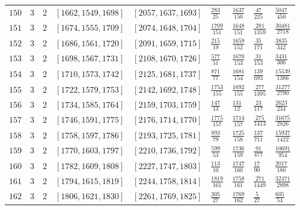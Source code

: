\documentclass[12pt]{extarticle}
\begin{document}
\begin{longtable}{lllllllll}
$150$ & $3$ & $2$ & $\left[1662, 1549, 1698\right]$ & $\left[2057, 1637, 1693\right]$ & $\frac{283}{25}$ & $\frac{1637}{150}$ & $\frac{47}{225}$ & $\frac{5047}{450}$ \\
$151$ & $3$ & $2$ & $\left[1674, 1555, 1709\right]$ & $\left[2074, 1648, 1704\right]$ & $\frac{1709}{151}$ & $\frac{1648}{151}$ & $\frac{281}{1359}$ & $\frac{30481}{2718}$ \\
$152$ & $3$ & $2$ & $\left[1686, 1561, 1720\right]$ & $\left[2091, 1659, 1715\right]$ & $\frac{215}{19}$ & $\frac{1659}{152}$ & $\frac{35}{171}$ & $\frac{3835}{342}$ \\
$153$ & $3$ & $2$ & $\left[1698, 1567, 1731\right]$ & $\left[2108, 1670, 1726\right]$ & $\frac{577}{51}$ & $\frac{1670}{153}$ & $\frac{31}{153}$ & $\frac{3431}{306}$ \\
$154$ & $3$ & $2$ & $\left[1710, 1573, 1742\right]$ & $\left[2125, 1681, 1737\right]$ & $\frac{871}{77}$ & $\frac{1681}{154}$ & $\frac{139}{693}$ & $\frac{15539}{1386}$ \\
$155$ & $3$ & $2$ & $\left[1722, 1579, 1753\right]$ & $\left[2142, 1692, 1748\right]$ & $\frac{1753}{155}$ & $\frac{1692}{155}$ & $\frac{277}{1395}$ & $\frac{31277}{2790}$ \\
$156$ & $3$ & $2$ & $\left[1734, 1585, 1764\right]$ & $\left[2159, 1703, 1759\right]$ & $\frac{147}{13}$ & $\frac{131}{12}$ & $\frac{23}{117}$ & $\frac{2623}{234}$ \\
$157$ & $3$ & $2$ & $\left[1746, 1591, 1775\right]$ & $\left[2176, 1714, 1770\right]$ & $\frac{1775}{157}$ & $\frac{1714}{157}$ & $\frac{275}{1413}$ & $\frac{31675}{2826}$ \\
$158$ & $3$ & $2$ & $\left[1758, 1597, 1786\right]$ & $\left[2193, 1725, 1781\right]$ & $\frac{893}{79}$ & $\frac{1725}{158}$ & $\frac{137}{711}$ & $\frac{15937}{1422}$ \\
$159$ & $3$ & $2$ & $\left[1770, 1603, 1797\right]$ & $\left[2210, 1736, 1792\right]$ & $\frac{599}{53}$ & $\frac{1736}{159}$ & $\frac{91}{477}$ & $\frac{10691}{954}$ \\
$160$ & $3$ & $2$ & $\left[1782, 1609, 1808\right]$ & $\left[2227, 1747, 1803\right]$ & $\frac{113}{10}$ & $\frac{1747}{160}$ & $\frac{17}{90}$ & $\frac{2017}{180}$ \\
$161$ & $3$ & $2$ & $\left[1794, 1615, 1819\right]$ & $\left[2244, 1758, 1814\right]$ & $\frac{1819}{161}$ & $\frac{1758}{161}$ & $\frac{271}{1449}$ & $\frac{32471}{2898}$ \\
$162$ & $3$ & $2$ & $\left[1806, 1621, 1830\right]$ & $\left[2261, 1769, 1825\right]$ & $\frac{305}{27}$ & $\frac{1769}{162}$ & $\frac{5}{27}$ & $\frac{605}{54}$ \\

\end{longtable}
\end{document}
